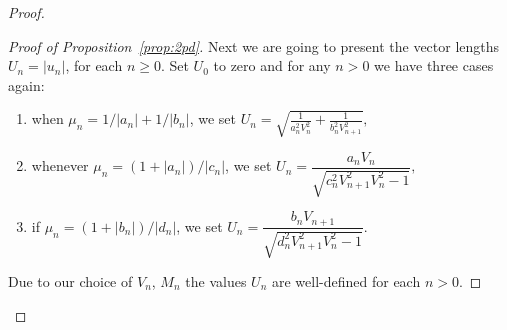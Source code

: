 \begin{proof}
\begin{proof}[Proof of Proposition~\ref{prop:2pd}]
        Next we are going to present the vector lengths $U_n = \lvert u_n \rvert$, for each $n \geq 0$.
        Set $U_0$ to zero and for any $n > 0$ we have three cases again:
        \begin{enumerate}
          \item when $\mu_n = 1/\lvert a_n \rvert+ 1/\lvert b_n \rvert$, we set 
              $
                U_n = \displaystyle\sqrt{\frac{1}{a_n^2 V_n^2} + \frac{1}{b_n^2 V_{n+1}^2}},
              $ 
          \item whenever $\mu_n = (1 + \lvert a_n \rvert)/\lvert c_n \rvert$, we set 
              $
                U_n =  \dfrac{a_n V_n}{\displaystyle\sqrt{c_n^2 V_{n+1}^2 V_n^2 - 1}},
              $
          \item if $\mu_n = (1 + \lvert b_n \rvert)/\lvert d_n \rvert$, we set 
              $
                U_n = \dfrac{b_n V_{n+1}}{\displaystyle\sqrt{ d_n^2 V_{n+1}^2 V_n^2 - 1}}.
              $
        \end{enumerate}

        Due to our choice of $V_n$, $M_n$ the values $U_n$ are well-defined for each $n > 0$.


\end{proof}
\end{proof}
